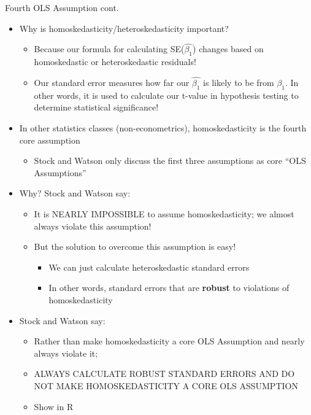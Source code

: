 \documentclass[
  8pt,
  ignorenonframetext,
  dvipsnames]{beamer}
\providecommand{\tightlist}{%
  \setlength{\itemsep}{0pt}\setlength{\parskip}{0pt}}
\renewcommand{\textbf}[1]{{\color{darkgray}\bfseries\fontfamily{Montserrat-TOsF}#1}}
\let\olditem\item
\renewcommand{\item}{%
  \olditem\vspace{4pt}
}
\begin{document}
\begin{frame}{Fourth OLS Assumption cont.}
\protect\hypertarget{fourth-ols-assumption-cont.-2}{}

\begin{itemize}
\tightlist
\item
  Why is homoskedasticity/heteroskedasticity important?

  \begin{itemize}
  \tightlist
  \item
    Because our formula for calculating SE(\(\hat{\beta_1}\)) changes
    based on homoskedastic or heteroskedastic residuals!
  \item
    Our standard error measures how far our \(\hat{\beta_1}\) is likely
    to be from \(\beta_1\). In other words, it is used to calculate our
    t-value in hypothesis testing to determine statistical significance!
  \end{itemize}
\item
  In other statistics classes (non-econometrics), homoskedasticity is
  the fourth core assumption

  \begin{itemize}
  \tightlist
  \item
    Stock and Watson only discuss the first three assumptions as core
    ``OLS Assumptions''
  \end{itemize}
\item
  Why? Stock and Watson say:

  \begin{itemize}
  \tightlist
  \item
    It is NEARLY IMPOSSIBLE to assume homoskedasticity; we almost always
    violate this assumption!
  \item
    But the solution to overcome this assumption is easy!

    \begin{itemize}
    \tightlist
    \item
      We can just calculate heteroskedastic standard errors
    \item
      In other words, standard errors that are \textbf{robust} to
      violations of homoskedasticity
    \end{itemize}
  \end{itemize}
\item
  Stock and Watson say:

  \begin{itemize}
  \tightlist
  \item
    Rather than make homoskedasticity a core OLS Assumption and nearly
    always violate it;
  \item
    ALWAYS CALCULATE ROBUST STANDARD ERRORS AND DO NOT MAKE
    HOMOSKEDASTICITY A CORE OLS ASSUMPTION
  \item
    Show in R
  \end{itemize}
\end{itemize}

\end{frame}
\end{document}
